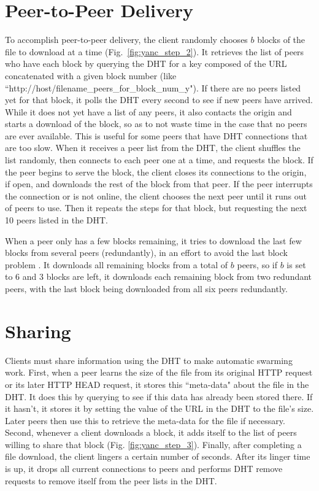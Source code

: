 \section{Peer-to-Peer Delivery}

To accomplish peer-to-peer delivery, the client randomly chooses $b$ blocks of the file to download at a time (Fig.~\ref{fig:yanc_step_2}).  
It retrieves the list of peers who have each block by querying the DHT for a key composed of
the URL concatenated with a given block number (like ``http://host/filename\_peers\_for\_block\_num\_y").  
If there are no peers listed yet for that block, it polls the DHT every second to see if new peers have arrived.
While it does not yet have a list of any peers, it also contacts the origin and starts a download of the block, so as to 
not waste time in the case that no peers are ever available.  This is useful for some peers that have DHT connections that are too slow.
When it receives a peer list from the DHT, the client shuffles the list randomly, then connects to each peer one at a time, and requests the block.  
If the peer begins to serve the block, the client closes its connections to the origin, if open, and downloads the rest of the block from that peer.  
If the peer interrupts the connection or is not online, the client chooses the next peer until it runs out of peers to use.  
Then it repeats the steps for that block, but requesting the next 10 peers listed in the DHT.

When a peer only has a few blocks remaining, it tries to download the last few blocks from several peers (redundantly), in an effort to avoid the last block problem \cite{last_block}.  
It downloads all remaining blocks from a total of $b$ peers, so if $b$ is set to 6 and 3 blocks are left, 
it downloads each remaining block from two redundant peers, with the
last block being downloaded from all six peers redundantly.

\section{Sharing}

Clients must share information using the DHT to make automatic swarming work.  First, when a peer learns the size of the file 
from its original HTTP request or its later HTTP HEAD request, it stores this ``meta-data" about the file
in the DHT.  It does this by querying to see if this data has already been stored there.  If it hasn't, it stores it by setting the value of the URL in the DHT to the file's size. 
Later peers then use this to retrieve the meta-data for the file if necessary.
Second, whenever a client downloads a block, it adds itself to the list of peers willing to share that block (Fig. \ref{fig:yanc_step_3}). 
Finally, after completing a file download, the client lingers a certain number of seconds.  After its linger time is up, it drops all current connections to peers 
and performs DHT remove requests to remove itself from the peer lists in the DHT.

